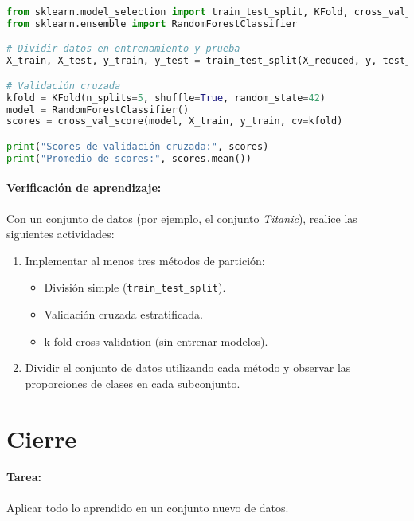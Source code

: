 \documentclass[a4,11pt]{aleph-notas}
\begin{document}
\begin{pycodigo}
\begin{lstlisting}[language=Python]
from sklearn.model_selection import train_test_split, KFold, cross_val_score
from sklearn.ensemble import RandomForestClassifier

# Dividir datos en entrenamiento y prueba
X_train, X_test, y_train, y_test = train_test_split(X_reduced, y, test_size=0.2, random_state=42)

# Validación cruzada
kfold = KFold(n_splits=5, shuffle=True, random_state=42)
model = RandomForestClassifier()
scores = cross_val_score(model, X_train, y_train, cv=kfold)

print("Scores de validación cruzada:", scores)
print("Promedio de scores:", scores.mean())
\end{lstlisting}
\end{pycodigo}


\paragraph{Verificación de aprendizaje:} Con un conjunto de datos  (por ejemplo, el conjunto \textit{Titanic}), realice las siguientes actividades:
\begin{enumerate}
    \item Implementar al menos tres métodos de partición:
    \begin{itemize}
        \item División simple (\texttt{train\_test\_split}).
        \item Validación cruzada estratificada.
        \item k-fold cross-validation (sin entrenar modelos).
    \end{itemize}
    \item Dividir el conjunto de datos utilizando cada método y observar las proporciones de clases en cada subconjunto.
\end{enumerate}



\section*{Cierre}

\paragraph{Tarea:} Aplicar todo lo aprendido en un conjunto nuevo de datos.
    
\end{document}
